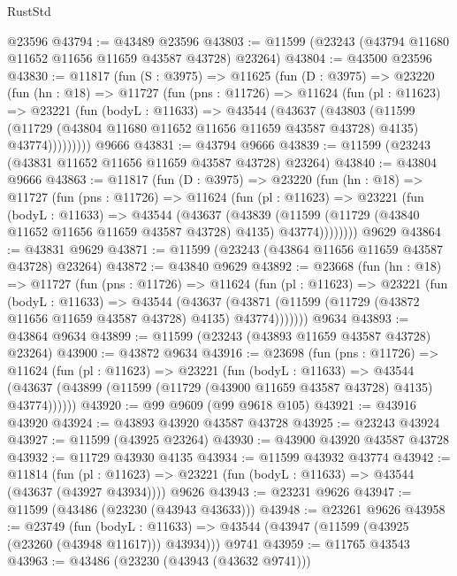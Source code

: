 \begin{lexlean}{RustStd}
\begin{coremodule}
    @23596
@43794 := @43489 @23596
@43803 := @11599 (@23243 (@43794 @11680 @11652 @11656 @11659 @43587 @43728) @23264)
@43804 := @43500 @23596
@43830 := @11817
    (fun (S : @3975) =>
    @11625
      (fun (D : @3975) =>
      @23220
        (fun (hn : @18) =>
        @11727
          (fun (pns : @11726) =>
          @11624
            (fun (pl : @11623) =>
            @23221
              (fun (bodyL : @11633) =>
              @43544
                (@43637
                  (@43803
                    (@11599
                      (@11729 (@43804 @11680 @11652 @11656 @11659 @43587 @43728) @4135)
                      @43774)))))))))
    @9666
@43831 := @43794 @9666
@43839 := @11599 (@23243 (@43831 @11652 @11656 @11659 @43587 @43728) @23264)
@43840 := @43804 @9666
@43863 := @11817
    (fun (D : @3975) =>
    @23220
      (fun (hn : @18) =>
      @11727
        (fun (pns : @11726) =>
        @11624
          (fun (pl : @11623) =>
          @23221
            (fun (bodyL : @11633) =>
            @43544
              (@43637
                (@43839
                  (@11599 (@11729 (@43840 @11652 @11656 @11659 @43587 @43728) @4135) @43774))))))))
    @9629
@43864 := @43831 @9629
@43871 := @11599 (@23243 (@43864 @11656 @11659 @43587 @43728) @23264)
@43872 := @43840 @9629
@43892 := @23668
    (fun (hn : @18) =>
    @11727
      (fun (pns : @11726) =>
      @11624
        (fun (pl : @11623) =>
        @23221
          (fun (bodyL : @11633) =>
          @43544
            (@43637
              (@43871 (@11599 (@11729 (@43872 @11656 @11659 @43587 @43728) @4135) @43774)))))))
    @9634
@43893 := @43864 @9634
@43899 := @11599 (@23243 (@43893 @11659 @43587 @43728) @23264)
@43900 := @43872 @9634
@43916 := @23698
    (fun (pns : @11726) =>
    @11624
      (fun (pl : @11623) =>
      @23221
        (fun (bodyL : @11633) =>
        @43544 (@43637 (@43899 (@11599 (@11729 (@43900 @11659 @43587 @43728) @4135) @43774))))))
@43920 := @99 @9609 (@99 @9618 @105)
@43921 := @43916 @43920
@43924 := @43893 @43920 @43587 @43728
@43925 := @23243 @43924
@43927 := @11599 (@43925 @23264)
@43930 := @43900 @43920 @43587 @43728
@43932 := @11729 @43930 @4135
@43934 := @11599 @43932 @43774
@43942 := @11814
    (fun (pl : @11623) => @23221 (fun (bodyL : @11633) => @43544 (@43637 (@43927 @43934))))
    @9626
@43943 := @23231 @9626
@43947 := @11599 (@43486 (@23230 (@43943 @43633)))
@43948 := @23261 @9626
@43958 := @23749
    (fun (bodyL : @11633) => @43544 (@43947 (@11599 (@43925 (@23260 (@43948 @11617))) @43934)))
    @9741
@43959 := @11765 @43543
@43963 := @43486 (@23230 (@43943 (@43632 @9741)))

\end{coremodule}
\end{lexlean}
